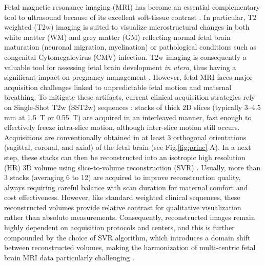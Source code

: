 \documentclass[preprint,authoryear,12pt]{elsarticle}
\begin{document}
Fetal magnetic resonance imaging (MRI) has become an essential complementary tool to ultrasound because of its excellent soft-tissue contrast \citep{wataganara_fetal_2016}. 
In particular, T2 weighted (T2w) imaging is suited to visualize microstructural changes in both white matter (WM) and grey matter (GM) reflecting normal fetal brain maturation (neuronal migration, myelination) or pathological conditions such as congenital Cytomegalovirus (CMV) infection. T2w imaging is consequently a valuable tool for assessing fetal brain development \textit{in utero}, thus having a significant impact on pregnancy management \citep{dubois_early_2014, yarnykh_quantitative_2018, griffiths_use_2017}. However, fetal MRI faces major acquisition challenges linked to unpredictable fetal motion and maternal breathing. To mitigate these artifacts, current clinical acquisition strategies rely on Single-Shot T2w (SST2w) sequences \citep{prayer_fetal_2004}: stacks of thick 2D slices (typically 3–4.5 mm at 1.5~T or 0.55~T) are acquired in an interleaved manner, fast enough to effectively freeze intra-slice motion, although inter-slice motion still occurs. Acquisitions are conventionally obtained in at least 3 orthogonal orientations (sagittal, coronal, and axial) of the fetal brain (see Fig.\ref{fig:princ} A). In a next step, these stacks can then be reconstructed into an isotropic high resolution (HR) 3D volume using slice-to-volume reconstruction (SVR) \citep{rousseau_registration-based_2006,gholipour_robust_2010,kuklisova-murgasova_reconstruction_2012, tourbier_efficient_2015}. Usually, more than 3 stacks (averaging 6 to 12) are acquired to improve reconstruction quality, always requiring careful balance with scan duration for maternal comfort and cost effectiveness. However, like standard weighted clinical sequences, these reconstructed volumes provide relative contrast for qualitative visualization rather than absolute measurements. Consequently, reconstructed images remain highly dependent on acquisition protocols and centers, and this is further compounded by the choice of SVR algorithm, which introduces a domain shift between reconstructed volumes, making the harmonization of multi-centric fetal brain MRI data particularly challenging \citep{sanchez_biometry_2025}.
\end{document}
